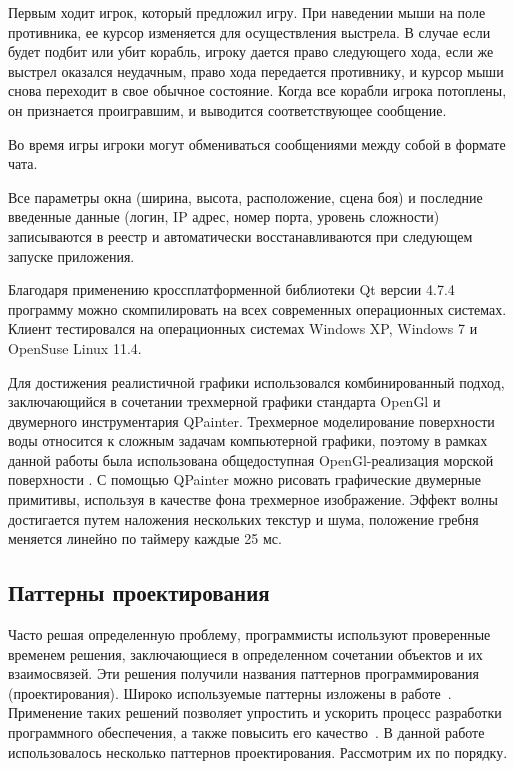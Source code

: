 \documentclass[12pt, a4paper, oneside]{article}
\begin{document}
Первым ходит игрок, который предложил игру. При наведении мыши на поле противника, ее курсор изменяется для осуществления выстрела. В случае если будет подбит или убит корабль, игроку дается право следующего хода, если же выстрел оказался неудачным, право хода передается противнику, и курсор мыши снова переходит в свое обычное состояние. Когда все корабли игрока потоплены, он признается проигравшим, и выводится соответствующее сообщение.

Во время игры игроки могут обмениваться сообщениями между собой в формате чата.

Все параметры окна (ширина, высота, расположение, сцена боя) и последние введенные данные (логин, IP адрес, номер порта, уровень сложности) записываются в реестр и автоматически восстанавливаются  при следующем запуске приложения. 

Благодаря применению кроссплатформенной библиотеки Qt версии 4.7.4 программу можно скомпилировать на всех современных операционных системах. Клиент тестировался на операционных системах Windows XP, Windows 7 и OpenSuse Linux 11.4.

Для достижения реалистичной графики использовался комбинированный подход, заключающийся в сочетании трехмерной графики стандарта OpenGl и двумерного инструментария QPainter. Трехмерное моделирование поверхности воды относится к сложным задачам компьютерной графики, поэтому в рамках данной работы была использована общедоступная OpenGl-реализация морской поверхности \cite{sea}. С помощью QPainter можно рисовать графические двумерные примитивы, используя в качестве фона трехмерное изображение. Эффект волны достигается путем наложения нескольких текстур и шума, положение гребня меняется линейно по таймеру каждые 25 мс. 

\subsection{Паттерны проектирования}

Часто решая определенную проблему, программисты используют проверенные временем решения, заключающиеся в определенном сочетании объектов и их взаимосвязей. Эти решения получили названия паттернов программирования (проектирования). Широко используемые паттерны изложены в работе~\cite{patterns}. Применение таких решений позволяет упростить и ускорить процесс разработки программного обеспечения, а также повысить его качество~\cite{pavlovskaya}.  
В данной работе использовалось несколько паттернов проектирования. Рассмотрим их по порядку.
\end{document}
